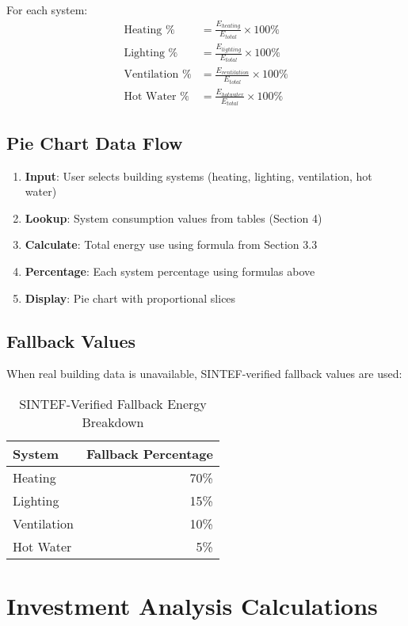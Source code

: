 \documentclass[12pt,a4paper]{article}
\begin{document}
For each system:
\begin{align}
\text{Heating \%} &= \frac{E_{heating}}{E_{total}} \times 100\% \\
\text{Lighting \%} &= \frac{E_{lighting}}{E_{total}} \times 100\% \\
\text{Ventilation \%} &= \frac{E_{ventilation}}{E_{total}} \times 100\% \\
\text{Hot Water \%} &= \frac{E_{hotwater}}{E_{total}} \times 100\%
\end{align}

\subsection{Pie Chart Data Flow}

\begin{enumerate}
\item \textbf{Input}: User selects building systems (heating, lighting, ventilation, hot water)
\item \textbf{Lookup}: System consumption values from tables (Section 4)
\item \textbf{Calculate}: Total energy use using formula from Section 3.3
\item \textbf{Percentage}: Each system percentage using formulas above
\item \textbf{Display}: Pie chart with proportional slices
\end{enumerate}

\subsection{Fallback Values}

When real building data is unavailable, SINTEF-verified fallback values are used:

\begin{table}[H]
\centering
\begin{tabular}{|l|r|}
\hline
\textbf{System} & \textbf{Fallback Percentage} \\
\hline
Heating & 70\% \\
Lighting & 15\% \\
Ventilation & 10\% \\
Hot Water & 5\% \\
\hline
\end{tabular}
\caption{SINTEF-Verified Fallback Energy Breakdown}
\end{table}

\section{Investment Analysis Calculations}
\end{document}
